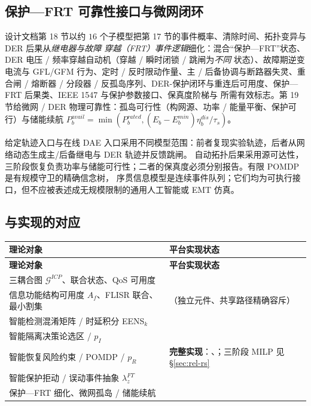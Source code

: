 \subsection{保护—FRT 可靠性接口与微网闭环}\label{sec:rel-icp-frt}
设计文档第 18 节以约 $16$ 个子模型把第 17 节的事件概率、清除时间、拓扑变异与 DER 后果从\emph{继电器与故障
穿越（FRT）事件逻辑}细化：混合“保护—FRT”状态、DER 电压 / 频率穿越自动机（穿越 / 瞬时闭锁 / 跳闸为\emph{不同}
状态）、故障期逆变电流与 GFL/GFM 行为、定时 / 反时限动作量、主 / 后备协调与断路器失灵、重合闸 / 熔断器 /
分段器 / 反孤岛序列、DER-保护闭环与重连后可用度、保护—FRT 后果类、IEEE 1547 与保护参数接口、保真度阶梯与
所需有效标志。第 19 节给微网 / DER 物理可靠性：孤岛可行性（构网源、功率 / 能量平衡、保护可行）与储能续航
$P_b^{avail}=\min(P_b^{rated},(E_b-E_b^{min})\eta_b^{dis}/\tau_s)$。
\begin{boundarynote}
给定轨迹入口与在线 DAE 入口采用不同模型范围：前者复现实验轨迹，后者从网络动态生成主/后备继电与 DER 轨迹并反馈跳闸。
自动拓扑后果采用源可达性，三阶段恢复负责功率与储能可行性；二者的保真度必须分别报告。有限 POMDP 是有规模守卫的精确信念树，
序贯信息模型是连续事件队列；它们均为可执行接口，但不应被表述成无规模限制的通用人工智能或 EMT 仿真。
\end{boundarynote}

\subsection{与实现的对应}\label{sec:rel-icp-impl}
\begin{center}\footnotesize
\begin{longtable}{@{}L{5.4cm}L{9.0cm}@{}}
\toprule
\textbf{理论对象} & \textbf{平台实现状态}\\
\midrule
\endfirsthead
\toprule
\textbf{理论对象} & \textbf{平台实现状态}\\
\midrule
\endhead
\bottomrule
\endfoot
三耦合图 $\mathcal G^{ICP}$、联合状态、QoS 可用度 & \\
信息功能结构可用度 $A_f$、FLISR 联合、最小割集 & （独立元件、共享路径精确容斥）\\
智能检测混淆矩阵 / 时延积分 EENS$_k$ & \\
智能隔离决策论选区 / $p_I$ & \\
智能恢复风险约束 / POMDP / $p_R$ & \textbf{完整实现}：、；三阶段 MILP 见 \S\ref{sec:rel-rs}\\
智能保护拒动 / 误动事件抽象 $\lambda_z^{FT}$ & \\
保护—FRT 细化、微网孤岛 / 储能续航 & \\
\end{longtable}
\end{center}


